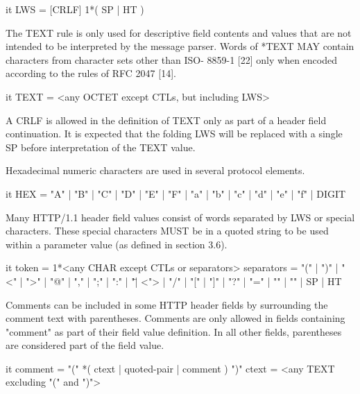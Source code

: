 \begin{vcode}{it}
       LWS            = [CRLF] 1*( SP | HT )
\end{vcode}

   The TEXT rule is only used for descriptive field contents and values
   that are not intended to be interpreted by the message parser. Words
   of *TEXT MAY contain characters from character sets other than ISO-
   8859-1 [22] only when encoded according to the rules of RFC 2047
   [14].

\begin{vcode}{it}
       TEXT           = <any OCTET except CTLs,
                        but including LWS>
\end{vcode}

   A CRLF is allowed in the definition of TEXT only as part of a header
   field continuation. It is expected that the folding LWS will be
   replaced with a single SP before interpretation of the TEXT value.

   Hexadecimal numeric characters are used in several protocol elements.

\begin{vcode}{it}
       HEX            = "A" | "B" | "C" | "D" | "E" | "F"
                      | "a" | "b" | "c" | "d" | "e" | "f" | DIGIT
\end{vcode}

   Many HTTP/1.1 header field values consist of words separated by LWS
   or special characters. These special characters MUST be in a quoted
   string to be used within a parameter value (as defined in section
   3.6).

\begin{vcode}{it}
       token          = 1*<any CHAR except CTLs or separators>
       separators     = "(" | ")" | "<" | ">" | "@"
                      | "," | ";" | ":" | "\" | <">
                      | "/" | "[" | "]" | "?" | "="
                      | "{" | "}" | SP | HT
\end{vcode}

   Comments can be included in some HTTP header fields by surrounding
   the comment text with parentheses. Comments are only allowed in
   fields containing "comment" as part of their field value definition.
   In all other fields, parentheses are considered part of the field
   value.

\begin{vcode}{it}
       comment        = "(" *( ctext | quoted-pair | comment ) ")"
       ctext          = <any TEXT excluding "(" and ")">
\end{vcode}

